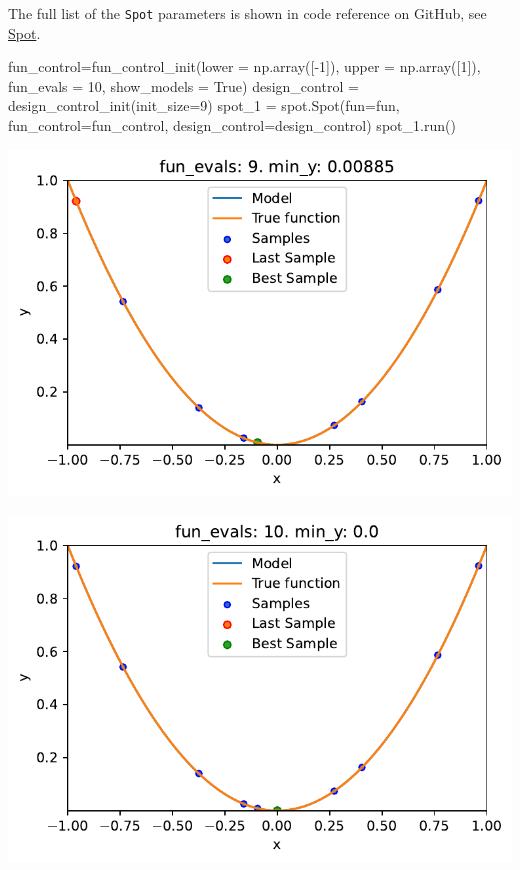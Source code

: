 \documentclass[
  letterpaper,
  DIV=11,
  numbers=noendperiod]{scrreprt}
\newenvironment{Shaded}{\begin{snugshade}}{\end{snugshade}}
\newcommand{\DecValTok}[1]{\textcolor[rgb]{0.68,0.00,0.00}{#1}}
\newcommand{\NormalTok}[1]{\textcolor[rgb]{0.00,0.23,0.31}{#1}}
\newcommand{\OperatorTok}[1]{\textcolor[rgb]{0.37,0.37,0.37}{#1}}
\newcommand{\VariableTok}[1]{\textcolor[rgb]{0.07,0.07,0.07}{#1}}
\begin{document}
The full list of the \texttt{Spot} parameters is shown in code reference
on GitHub, see
\href{https://sequential-parameter-optimization.github.io/spotPython/reference/spotPython/spot/spot/\#spotPython.spot.spot}{Spot}.

\begin{Shaded}
\begin{Highlighting}[]
\NormalTok{fun\_control}\OperatorTok{=}\NormalTok{fun\_control\_init(lower }\OperatorTok{=}\NormalTok{ np.array([}\OperatorTok{{-}}\DecValTok{1}\NormalTok{]),}
\NormalTok{                     upper }\OperatorTok{=}\NormalTok{ np.array([}\DecValTok{1}\NormalTok{]),}
\NormalTok{                     fun\_evals }\OperatorTok{=} \DecValTok{10}\NormalTok{,}
\NormalTok{                     show\_models }\OperatorTok{=} \VariableTok{True}\NormalTok{)               }
\NormalTok{design\_control }\OperatorTok{=}\NormalTok{ design\_control\_init(init\_size}\OperatorTok{=}\DecValTok{9}\NormalTok{)}
\NormalTok{spot\_1 }\OperatorTok{=}\NormalTok{ spot.Spot(fun}\OperatorTok{=}\NormalTok{fun,}
\NormalTok{                   fun\_control}\OperatorTok{=}\NormalTok{fun\_control,}
\NormalTok{                   design\_control}\OperatorTok{=}\NormalTok{design\_control)}
\NormalTok{spot\_1.run()}
\end{Highlighting}
\end{Shaded}

\includegraphics{007_num_spot_intro_files/figure-pdf/cell-9-output-1.pdf}

\includegraphics{007_num_spot_intro_files/figure-pdf/cell-9-output-2.pdf}
\end{document}

